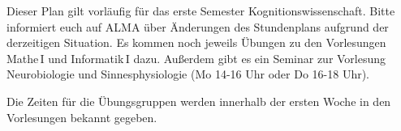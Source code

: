 Dieser Plan gilt vorläufig für das erste Semester Kognitionswissenschaft. Bitte informiert euch auf ALMA über Änderungen des Stundenplans aufgrund der derzeitigen Situation.
Es kommen noch jeweils Übungen zu den Vorlesungen Mathe\,I und Informatik\,I %
dazu.
Außerdem gibt es ein Seminar zur Vorlesung Neurobiologie und Sinnesphysiologie (Mo 14-16 Uhr oder Do 16-18 Uhr).

Die Zeiten für die Übungsgruppen werden innerhalb der ersten Woche in den Vorlesungen bekannt gegeben.

